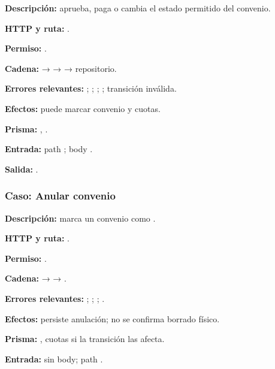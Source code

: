 \textbf{Descripción:} aprueba, paga o cambia el estado permitido del convenio.  

\textbf{HTTP y ruta:} \texttt{}.  

\textbf{Permiso:} \texttt{}.  

\textbf{Cadena:} \texttt{} → \texttt{} → \texttt{} → repositorio.  

\textbf{Errores relevantes:} \texttt{}; \texttt{}; \texttt{}; \texttt{}; transición inválida.  

\textbf{Efectos:} \texttt{} puede marcar convenio y cuotas.  

\textbf{Prisma:} \texttt{}, \texttt{}.  

\textbf{Entrada:} path \texttt{}; body \texttt{}.  

\textbf{Salida:} \texttt{}.


\subsubsection{Caso: Anular convenio}


\textbf{Descripción:} marca un convenio como \texttt{}.  

\textbf{HTTP y ruta:} \texttt{}.  

\textbf{Permiso:} \texttt{}.  

\textbf{Cadena:} \texttt{} → \texttt{} → \texttt{}.  

\textbf{Errores relevantes:} \texttt{}; \texttt{}; \texttt{}; \texttt{}.  

\textbf{Efectos:} persiste anulación; no se confirma borrado físico.  

\textbf{Prisma:} \texttt{}, cuotas si la transición las afecta.  

\textbf{Entrada:} sin body; path \texttt{}.  

